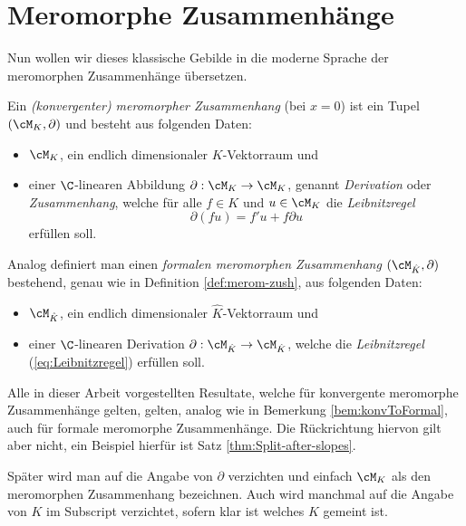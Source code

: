 \section{Meromorphe Zusammenhänge}
Nun wollen wir dieses klassische Gebilde in die moderne Sprache der
meromorphen Zusammenhänge übersetzen.
\begin{defn} \label{def:merom-zush}
Ein \emph{(konvergenter) meromorpher Zusammenhang} (bei $x=0$) ist ein Tupel
$(\cM_K,\partial)$ und besteht aus folgenden Daten:
\begin{itemize}
\item $\cM_K$, ein endlich dimensionaler $K$-Vektorraum und
\item einer $\C$-linearen Abbildung $\partial:\cM_K\rightarrow \cM_K$,
genannt \emph{Derivation} oder \emph{Zusammenhang}, welche für alle $f\in K$
und $u\in \cM_K$ die \emph{Leibnitzregel}
\begin{equation}\label{eq:Leibnitzregel}
\partial(fu)=f'u+f\partial u %
\end{equation}
erfüllen soll.
\end{itemize}
\end{defn}
\begin{bem} %
Analog definiert man einen \emph{formalen meromorphen Zusammenhang}
$(\cM_{\hat K},\partial)$ bestehend, genau wie in Definition
\ref{def:merom-zush}, aus folgenden Daten:
\begin{itemize}
\item $\cM_{\hat K}$, ein endlich dimensionaler $\hat K$-Vektorraum und
\item einer $\C$-linearen Derivation $\partial:\cM_{\hat K}\rightarrow
\cM_{\hat K}$, welche die \emph{Leibnitzregel} (\ref{eq:Leibnitzregel})
erfüllen soll.
\end{itemize}
\end{bem}

\begin{bem}
Alle in dieser Arbeit vorgestellten Resultate, welche für konvergente
meromorphe Zusammenhänge gelten, gelten, analog wie in Bemerkung
\ref{bem:konvToFormal}, auch für formale meromorphe Zusammenhänge.
Die Rückrichtung hiervon gilt aber nicht, ein Beispiel hierfür ist Satz
\ref{thm:Split-after-slopes}.
\end{bem}
\begin{bem}
Später wird man auf die Angabe von $\partial$ verzichten und einfach
$\cM_K$ als den meromorphen Zusammenhang bezeichnen. Auch wird manchmal auf die
Angabe von $K$ im Subscript verzichtet, sofern klar ist welches $K$ gemeint
ist.
\end{bem}

